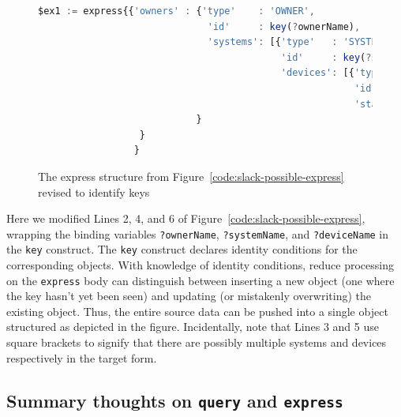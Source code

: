 \documentclass[10pt,letterpaper]{article} %
\newcommand{\stt}[1]{\texttt{#1}} %
\begin{document}
\begin{figure}[H]
  \caption{The express structure from Figure~\ref{code:slack-possible-express} revised to identify keys}
 \label{code:slack-express-with-keys}
\begin{lstlisting}[language=JavaScript,basicstyle=\ttfamily\scriptsize,numberstyle=\scriptsize]
$ex1 := express{{'owners' : {'type'    : 'OWNER',
                              'id'     : key(?ownerName),
                              'systems': [{'type'   : 'SYSTEM',
                                           'id'     : key(?systemName),
                                           'devices': [{'type'  : 'DEVICE',
                                                        'id'    : key(?deviceName),
                                                        'status': ?status}]}]
                            }
                  }
                 }
\end{lstlisting}
\end{figure}  \vspace{-2em}

Here we modified Lines 2, 4, and 6 of Figure~\ref{code:slack-possible-express}, wrapping the binding variables
\stt{?ownerName}, \stt{?systemName}, and \stt{?deviceName} in the \stt{key} construct.
The \stt{key} construct declares identity conditions for the corresponding objects.
With knowledge of identity conditions, reduce processing on the \stt{express} body can distinguish between inserting a new object (one where the key hasn't yet been seen) and updating (or mistakenly overwriting) the existing object.
Thus, the entire source data can be pushed into a single object structured as depicted in the figure.
Incidentally, note that Lines 3 and 5 use square brackets to signify that there are possibly multiple systems and devices respectively
in the target form.


\subsection{Summary thoughts on \stt{query} and \stt{express}}
\end{document}

